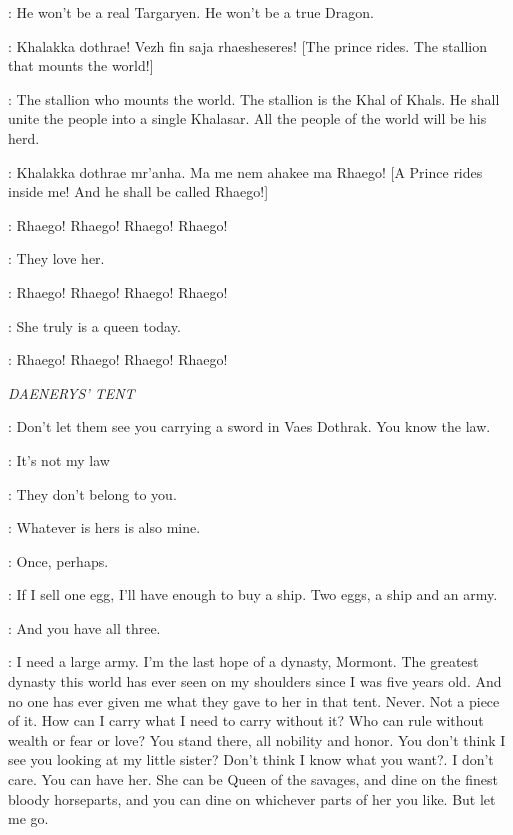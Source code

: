 \VISERYS:  He won't be a real Targaryen. He won't be a true Dragon. 


\PRIESTESS: Khalakka dothrae! Vezh fin saja rhaesheseres! [The prince rides. The stallion that mounts the world!] 

\JORAH: The stallion who mounts the world. The stallion is the Khal of Khals. He shall unite the people into a single Khalasar. All the people of the world will be his herd. 

\DAENERYS:  Khalakka dothrae mr'anha.  Ma me nem ahakee ma Rhaego! [A Prince rides inside me! And he shall be called Rhaego!] 

\CROWD: Rhaego! Rhaego! Rhaego! Rhaego! 

\VISERYS:  They love her. 


\CROWD: Rhaego! Rhaego! Rhaego! Rhaego! 

\JORAH:  She truly is a queen today.  

\CROWD: Rhaego! Rhaego! Rhaego! Rhaego! 


\scene

\textit{DAENERYS' TENT} 


\JORAH:  Don't let them see you carrying a sword in Vaes Dothrak. You know the law. 

\VISERYS: It's not my law 

\JORAH:  They don't belong to you. 

\VISERYS:  Whatever is hers is also mine.  

\JORAH:  Once, perhaps. 

\VISERYS:  If I sell one egg, I'll have enough to buy a ship. Two eggs, a ship and an army. 

\JORAH:  And you have all three. 

\VISERYS:  I need a large army. I'm the last hope of a dynasty, Mormont. The greatest dynasty this world has ever seen on my shoulders since I was five years old. And no one has ever given me what they gave to her in that tent. Never. Not a piece of it. How can I carry what I need to carry without it? Who can rule without wealth or fear or love?  You stand there, all nobility and honor.  You don't think I see you looking at my little sister? Don't think I know what you want?. I don't care. You can have her. She can be Queen of the savages, and dine on the finest bloody horseparts, and you can dine on whichever parts of her you like. But let me go. 

